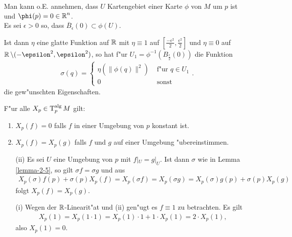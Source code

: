 \begin{bew}
  Man kann o.E. annehmen, dass $U$ Kartengebiet einer Karte $\phi$ von $M$ um $p$ ist und $\phi(p) = 0 \in \R^n$.\\

  Es sei $\epsilon > 0$ so, dass $\overline B_\epsilon(0) \subset \phi(U)$. \\

\begin{center}
  
\end{center}

  Ist dann $\eta$ eine glatte Funktion auf $\operatorname{\mathbb{R}}$ mit $\eta \equiv 1$ auf $\left[\frac{-\epsilon^{2}}{2},\frac{\epsilon^2}{2}\right]$ und $\eta \equiv 0$ auf $\R \setminus (-\epsilon^2,\epsilon^2)$, so hat f"ur $U_1 = \phi^{-1}(B_{\frac{\epsilon}{2}}(0))$ die Funktion
  \begin{align*}
    \sigma(q) =
    \begin{cases}
      \eta(\|\phi(q)\|^2) & \text{ f"ur } q \in U_1\\
      0 & \text{ sonst }
    \end{cases}.
  \end{align*}
  die gew"unschten Eigenschaften.
\end{bew}

\begin{Lemma}
F"ur alle $X_p\in\operatorname{T}_p^{\text{alg}}M$ gilt:
\begin{enumerate}[label=(\roman*),widest=ii]
\item $X_p(f) = 0$ falls $f$ in einer Umgebung von $p$ konstant ist.
\item $X_p(f) = X_p(g)$ falls $f$ und $g$ auf einer Umgebung "ubereinstimmen.
\end{enumerate}
\end{Lemma}

\begin{bew}\begin{enumerate}[label=(\roman*),widest=ii,leftmargin=*]
\item[(ii)]
	Es sei $U$ eine Umgebung von $p$ mit $f|_U = g|_U$. Ist dann $\sigma$ wie in Lemma \ref{lemma-2-5}, so gilt $\sigma f = \sigma g$ und aus
	\begin{align*}
		X_p(\sigma)f(p)+\sigma(p)X_p(f) = X_{p}(\sigma f) = X_p(\sigma g) = X_p(\sigma) g(p) + \sigma(p) X_p(g)
	\end{align*}
	folgt $X_p(f) = X_p(g)$.\\
\item[(i)]
	Wegen der $\operatorname{\mathbb{R}}$-Linearit"at und (ii) gen"ugt es $f \equiv 1$ zu betrachten. Es gilt
	\begin{align*}
		X_p(1) = X_p(1 \cdot 1) = X_p(1) \cdot 1 + 1 \cdot X_p(1) = 2 \cdot X_p(1),
	\end{align*}
	also $X_p(1) = 0$.
\end{enumerate}\end{bew}

